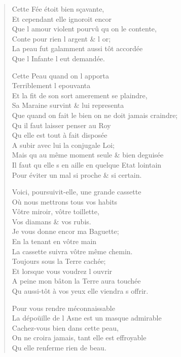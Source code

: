 \documentclass[14pt,a4paper]{memoir}
\begin{document}
{{\begin{otherlanguage}{french}
\begin{verse}
\vin Cette Fée étoit bien sçavante, \\
\vin Et cependant elle ignoroit encor \\
Que l\textquotesingle{} amour violent pourvû qu\textquotesingle{} on le contente, \\
\vin Conte pour rien l\textquotesingle{} argent \& l\textquotesingle{} or; \\
La peau fut galamment aussi tôt accordée \\
\vin Que l\textquotesingle{} Infante l\textquotesingle{} eut demandée.

\vin Cette Peau quand on l\textquotesingle{} apporta \\
\vin Terriblement l\textquotesingle{} epouvanta \\
Et la fit de son sort amerement se plaindre, \\
Sa Maraine survint \& lui representa \\
Que quand on fait le bien on ne doit jamais craindre; \\
\vin Qu\textquotesingle{} il faut laisser penser au Roy \\
\vin Qu\textquotesingle{} elle est tout à fait disposée \\
A subir avec lui la conjugale Loi; \\
Mais qu\textquotesingle{} au même moment seule \& bien deguisée \\
Il faut qu\textquotesingle{} elle s\textquotesingle{} en aille en quelque Etat lointain \\
Pour éviter un mal si proche \& si certain.

Voici, poursuivit-elle, une grande cassette \\
\vin Où nous mettrons tous vos habits \\
\vin Vôtre miroir, vôtre toillette, \\
\vin Vos diamans \& vos rubis. \\
\vin Je vous donne encor ma Baguette; \\
\vin En la tenant en vôtre main \\
La cassette suivra vôtre même chemin. \\
\vin Toujours sous la Terre cachée; \\
\vin Et lorsque vous voudrez l\textquotesingle{} ouvrir \\
A peine mon bâton la Terre aura touchée \\
Qu\textquotesingle{} aussi-tôt à vos yeux elle viendra s\textquotesingle{} offrir.

\vin Pour vous rendre méconnaissable \\
La dépoüille de l\textquotesingle{} Asne est un masque admirable \\
\vin Cachez-vous bien dans cette peau, \\
On ne croira jamais, tant elle est effroyable \\
\vin Qu\textquotesingle{} elle renferme rien de beau.


\end{verse}
\end{otherlanguage}}}
\end{document}
